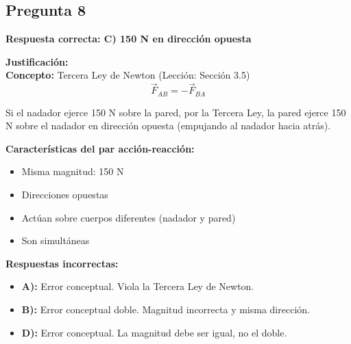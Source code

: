 \begin{respuestabox}
\subsection{Pregunta 8}
\textcolor{verdecorrecto}{\textbf{Respuesta correcta: C) 150 N en dirección opuesta}}

\textbf{Justificación:}\\
\textbf{Concepto:} Tercera Ley de Newton (Lección: Sección 3.5)
$$\vec{F}_{AB} = -\vec{F}_{BA}$$

Si el nadador ejerce 150 N sobre la pared, por la Tercera Ley, la pared ejerce 150 N sobre el nadador en dirección opuesta (empujando al nadador hacia atrás).

\textbf{Características del par acción-reacción:}
\begin{itemize}
    \item Misma magnitud: 150 N
    \item Direcciones opuestas
    \item Actúan sobre cuerpos diferentes (nadador y pared)
    \item Son simultáneas
\end{itemize}

\textbf{Respuestas incorrectas:}
\begin{itemize}
    \item \textbf{A):} Error conceptual. Viola la Tercera Ley de Newton.
    \item \textbf{B):} Error conceptual doble. Magnitud incorrecta y misma dirección.
    \item \textbf{D):} Error conceptual. La magnitud debe ser igual, no el doble.
\end{itemize}
\end{respuestabox}

